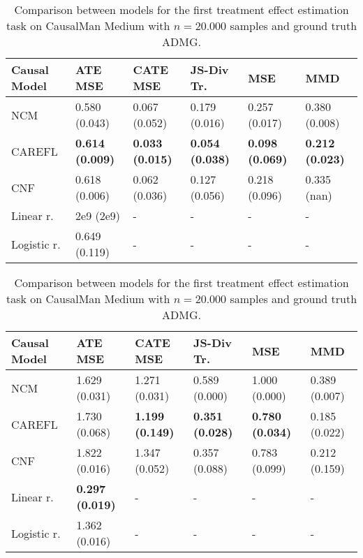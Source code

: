 \begin{table*}[h] 
\centering
\begin{tabular}{ p{1.5cm}|p{1.9cm}|p{1.9cm}|p{1.9cm}|p{1.9cm}|p{1.9cm} }
 Causal Model & ATE MSE & CATE MSE & JS-Div Tr. & MSE &  MMD\\
 \hline
 NCM                 & 0.580 (0.043)                  & 0.067 (0.052)                 & 0.179 (0.016)                    & 0.257 (0.017)               & 0.380 (0.008)               \\ 
CAREFL              & \textbf{0.614 (0.009)}                  & \textbf{0.033 (0.015)}                 & \textbf{0.054 (0.038)}    & \textbf{0.098 (0.069)}               & \textbf{0.212 (0.023)}               \\
CNF                 & 0.618 (0.006)                  & 0.062 (0.036)                 & 0.127 (0.056)                  & 0.218 (0.096)               & 0.335 (nan)                 \\
Linear r.  & 2e9 (2e9) &- &  -   &     -  &   -  \\
Logistic r. & 0.649 (0.119)                  & -    &      -           &    -            &           -       \\

\end{tabular}
\caption{Comparison between models for the first treatment effect estimation task on CausalMan Medium with $n = 20.000$ samples and ground truth ADMG. }
\label{table:effect_estimation_medium_results_1}
\end{table*}



\begin{table*}[h] 
\centering
\begin{tabular}{ p{1.5cm}|p{1.9cm}|p{1.9cm}|p{1.9cm}|p{1.9cm}|p{1.9cm} }
 Causal Model & ATE MSE & CATE MSE & JS-Div Tr. &  MSE &  MMD\\
 \hline
 NCM               & 1.629 (0.031)                 & 1.271 (0.031)                 & 0.589 (0.000)               & 1.000 (0.000)               & 0.389 (0.007)              \\ 
CAREFL              & 1.730 (0.068)                 & \textbf{1.199 (0.149)}                 & \textbf{0.351 (0.028)}               & \textbf{0.780 (0.034)}               & 0.185 (0.022)              \\
CNF                 & 1.822 (0.016)                 & 1.347 (0.052)                 & 0.357 (0.088)               & 0.783 (0.099)               & 0.212 (0.159)              \\
Linear r.  & \textbf{0.297 (0.019)}                 & -     &    -    &       -   &     -  \\
Logistic r. & 1.362 (0.016)                 & -   &   -   &   -    &   -   \\

\end{tabular}
\caption{Comparison between models for the first treatment effect estimation task on CausalMan Medium with $n = 20.000$ samples and ground truth ADMG. }
\label{table:effect_estimation_medium_results_2}
\end{table*}

